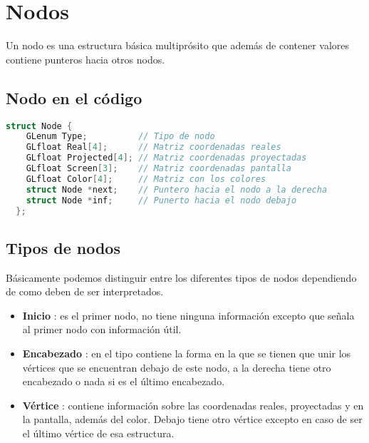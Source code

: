 \section{Nodos}
Un nodo es una estructura básica multiprósito que además de contener valores contiene punteros hacia otros nodos.
\subsection{Nodo en el código}
\begin{lstlisting}[language=C]
  struct Node {
    GLenum Type;          // Tipo de nodo
    GLfloat Real[4];      // Matriz coordenadas reales
    GLfloat Projected[4]; // Matriz coordenadas proyectadas
    GLfloat Screen[3];    // Matriz coordenadas pantalla
    GLfloat Color[4];     // Matriz con los colores
    struct Node *next;    // Puntero hacia el nodo a la derecha  
    struct Node *inf;     // Punerto hacia el nodo debajo
  };
\end{lstlisting}
\subsection{Tipos de nodos}
Básicamente podemos distinguir entre los diferentes tipos de nodos dependiendo de como deben de ser interpretados.
\begin{itemize}
\item{\textbf{Inicio} : es el primer nodo, no tiene ninguna información excepto que señala al primer nodo con información útil.}
\item{\textbf{Encabezado} : en el tipo contiene la forma en la que se tienen que unir los vértices que se encuentran debajo de este nodo, a la derecha tiene otro encabezado o nada si es el último encabezado.}
  \item{\textbf{Vértice} : contiene información sobre las coordenadas reales, proyectadas y en la pantalla, además del color. Debajo tiene otro vértice excepto en caso de ser el último vértice de esa estructura.}
\end{itemize}
